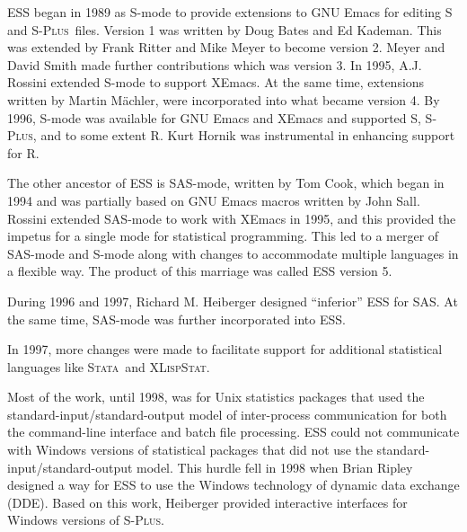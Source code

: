 \documentclass{article}
\newcommand*{\SAS}{\textsc{SAS}}
\newcommand*{\Splus}{\textsc{S-Plus}}
\newcommand*{\XLispStat}{\textsc{XLispStat}}
\newcommand*{\Stata}{\textsc{Stata}}
\newcommand{\stexttt}[1]{{\small\texttt{#1}}}
\begin{document}
ESS began in 1989 as S-mode to provide extensions to GNU Emacs for editing 
S and \Splus\ files.  Version 1 was written by Doug Bates and Ed Kademan.  
This was extended by Frank Ritter and Mike Meyer to become version 2.  Meyer 
and David Smith made further contributions which was version 3.
In 1995, A.J. Rossini extended S-mode to support XEmacs.  At the same time, 
extensions written by Martin M{\"a}chler, were incorporated into what became
version 4.  By 1996, S-mode was available for GNU Emacs and XEmacs and supported S, 
\Splus, and to some extent R.  Kurt Hornik was instrumental in enhancing support
for R.

The other ancestor of ESS is SAS-mode, written by Tom Cook, which began in 1994 
and was partially based on GNU Emacs macros written by John Sall.
Rossini extended SAS-mode to work with XEmacs in 1995, and this provided the
impetus for a single mode for statistical programming.
This led to a merger of SAS-mode and S-mode along with changes
to accommodate multiple languages in a flexible way.  The product of this
marriage was called ESS version 5.

During 1996 and 1997, Richard M. Heiberger designed ``inferior'' ESS for \SAS.
At the same time, SAS-mode was further incorporated into ESS.

In 1997, more changes were made to facilitate
support for additional statistical languages like \Stata\ and \XLispStat.

Most of the work, until 1998, was for Unix statistics
packages that used the standard-input/standard-output model of inter-process
communication for both the command-line interface and batch file
processing.  ESS could not communicate
with Windows versions of statistical packages that did not
use the standard-input/standard-output model.  This hurdle
fell in 1998 when Brian Ripley designed a way for ESS to use
the Windows technology of dynamic data exchange (DDE).
Based on this work, Heiberger provided interactive interfaces
for Windows versions of \Splus.
\end{document}
